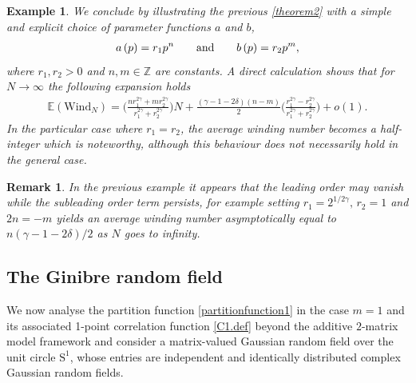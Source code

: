 \documentclass[pdflatex,sn-mathphys-num]{sn-jnl}
\theoremstyle{thmstyleone}
\newtheorem{example}[theorem]{Example}
\newtheorem{remark}[theorem]{Remark}
\numberwithin{equation}{section}
\newcommand{\Sp}{\mathrm{S}^{1}}
\begin{document}
\begin{example}
   We conclude by illustrating the previous \autoref{theorem2} with a simple and explicit choice of parameter functions $a$ and $b$,
    \begin{align}
        a\left(p\right)=r_{1}p^n%
        \qquad{\rm and}\qquad b\left(p\right)=r_{2}p^m,
    \end{align}
    where $r_{1},r_{2}>0$ and $n,m\in\mathbb{Z}$ are constants. A direct calculation shows that for $N\to\infty$ the following expansion holds
    \begin{align}
        \mathbb{E}\left(\mathrm{Wind}_{N} \right)=\Bigg(\frac{nr_{1}^{2\gamma}+mr_{2}^{2\gamma}}{r_{1}^{2\gamma}+r_{2}^{2\gamma}}\Bigg)N+\frac{\left( \gamma-1-2\delta \right)\left( n-m \right)}{2}\Bigg(\frac{r_{1}^{2\gamma}-r_{2}^{2\gamma}}{r_{1}^{2\gamma}+r_{2}^{2\gamma}}\Bigg)+o\left( 1 \right).
    \end{align}
    In the particular case where $r_{1}=r_{2}$, the average winding number becomes a half-integer which is noteworthy, although this behaviour does not necessarily hold in the general case.
\end{example}
\begin{remark}
    In the previous example it appears that the leading order may vanish while the subleading order term persists, for example setting $r_{1}=2^{1/2\gamma},\,r_{2}=1$ and $2n=-m$ yields an average winding number asymptotically equal to $n(\gamma-1-2\delta)/2$ as $N$ goes to infinity.
\end{remark}

\subsection{The Ginibre random field}\label{sec2.1}

We now analyse the partition function \eqref{partitionfunction1} in the case $m=1$ and its associated 1-point correlation function \eqref{C1.def} beyond the additive $2$-matrix model framework and consider a matrix-valued Gaussian random field over the unit circle $\Sp$, whose entries are independent and identically distributed complex Gaussian random fields. 
\end{document}
